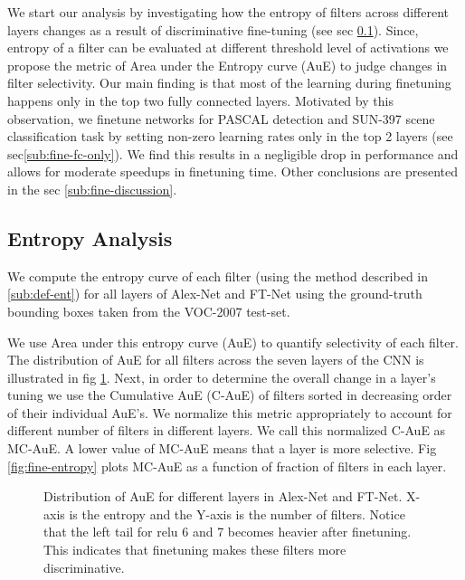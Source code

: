 \documentclass[runningheads]{llncs}
\begin{document}
We start our analysis by investigating how the entropy of filters across different layers changes as a result of discriminative fine-tuning (see sec \ref{sub:fine-entropy}). Since, entropy of a filter can be evaluated at different threshold level of activations we propose the metric of Area under the Entropy curve (AuE) to judge changes in filter selectivity. Our main finding is that most of the learning during finetuning happens only in the top two fully connected layers. Motivated by this observation, we finetune networks for PASCAL detection and SUN-397 scene classification task by setting non-zero learning rates only in the top 2 layers (see sec\ref{sub:fine-fc-only}). We find this results in a negligible drop in performance and allows for moderate speedups in finetuning time. Other conclusions are presented in the sec \ref{sub:fine-discussion}.

\subsection{Entropy Analysis}
\label{sub:fine-entropy}
We compute the entropy  curve of each filter (using the method described in \ref{sub:def-ent}) for all layers of Alex-Net and FT-Net using the ground-truth bounding boxes taken from the VOC-2007 test-set. 

We use Area under this entropy curve (AuE) to quantify selectivity of each filter. The distribution of AuE for all filters across the seven layers of the CNN is illustrated in fig \ref{fig:fine-hist}. Next, in order to determine the overall change in a layer's tuning we use the Cumulative AuE (C-AuE) of filters sorted in decreasing order of their individual AuE's. We normalize this metric appropriately to account for different number of filters in different layers. We call this normalized C-AuE as MC-AuE. A lower value of MC-AuE means that a layer is more selective.  Fig \ref{fig:fine-entropy} plots MC-AuE as a function of fraction of filters in each layer. 

\begin{figure}[t!]
\centering
{}
\caption{Distribution of AuE for different layers in Alex-Net and FT-Net. X-axis is the entropy and the Y-axis is the number of filters. Notice that the left tail for relu 6 and 7 becomes heavier after finetuning. This indicates that finetuning makes these filters more discriminative.}
\label{fig:fine-hist}
\end{figure}
\end{document}
